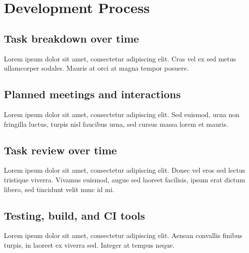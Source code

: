\chapter{Development Process}

\section{Task breakdown over time}
Lorem ipsum dolor sit amet, consectetur adipiscing elit. Cras vel ex sed metus
ullamcorper sodales. Mauris at orci at magna tempor posuere.

\section{Planned meetings and interactions}
Lorem ipsum dolor sit amet, consectetur adipiscing elit. Sed euismod, urna non
fringilla luctus, turpis nisl faucibus urna, sed cursus massa lorem et mauris.

\section{Task review over time}
Lorem ipsum dolor sit amet, consectetur adipiscing elit. Donec vel eros sed
lectus tristique viverra. Vivamus euismod, augue sed laoreet facilisis, ipsum
erat dictum libero, sed tincidunt velit nunc id mi.

\section{Testing, build, and CI tools}
Lorem ipsum dolor sit amet, consectetur adipiscing elit. Aenean convallis
finibus turpis, in laoreet ex viverra sed. Integer at tempus neque.
